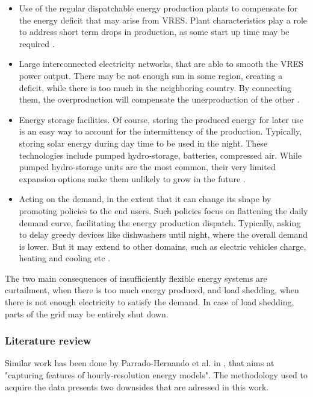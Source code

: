 \begin{itemize}
    \item Use of the regular dispatchable energy production plants to compensate for the energy deficit that may arise from VRES. Plant characteristics play a role to address short term drops in production, as some start up time may be required \cite{flexibility-storage-planning}.
    \item Large interconnected electricity networks, that are able to smooth the VRES power output. There may be not enough sun in some region, creating a deficit, while there is too much in the neighboring country. By connecting them, the overproduction will compensate the unerproduction of the other \cite{flexibility-connection}.
    \item Energy storage facilities. Of course, storing the produced energy for later use is an easy way to account for the intermittency of the production. Typically, storing solar energy during day time to be used in the night. These technologies include pumped hydro-storage, batteries, compressed air. While pumped hydro-storage units are the most common, their very limited expansion options make them unlikely to grow in the future \cite{flexibility-demdandside-forecasts-storage}.
    \item Acting on the demand, in the extent that it can change its shape by promoting policies to the end users. Such policies focus on flattening the daily demand curve, facilitating the energy production dispatch. Typically, asking to delay greedy devices like dishwashers until night, where the overall demand is lower. But it may extend to other domains, such as electric vehicles charge, heating and cooling etc \cite{flexibility-demdandside-forecasts-storage}.
\end{itemize}

The two main consequences of insufficiently flexible energy systems are curtailment, when there is too much energy produced, and load shedding, when there is not enough electricity to satisfy the demand. In case of load shedding, parts of the grid may be entirely shut down.

\subsubsection{Literature review}

Similar work has been done by Parrado-Hernando et al. in \cite{Hernando2022}, that aims at "capturing features of hourly-resolution energy models". The methodology used to acquire the data presents two downsides that are adressed in this work.

